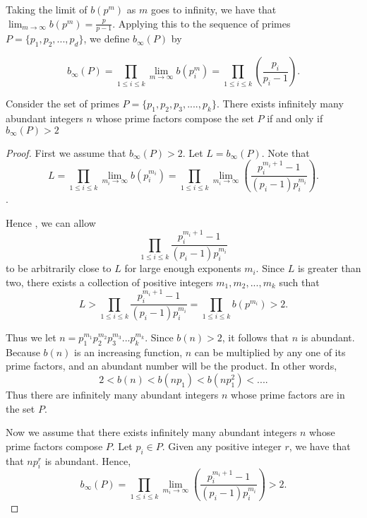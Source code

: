 \documentclass[../paper.tex]{article}
\begin{document}
Taking the limit of $b(p^m)$ as $m$ goes to infinity, we have that
$\lim_{m \rightarrow \infty}b(p^m) = \frac{p}{p-1}$.
Applying this to the sequence of primes $P = \{p_1, p_2, ..., p_d\}$,
we define $b_{\infty}(P)$ by

\begin{equation}\label{b_inf_def}
  b_{\infty}(P) 
  = \prod_{1 \leq i \leq k} \lim_{m \rightarrow \infty}b(p_i^m)
                = \prod_{1 \leq i \leq k}(\frac{p_i}{p_i - 1}) .
\end{equation}

\begin{theorem}\label{b_inf_1}
Consider the set of primes 
%
$P = \{p_{1}, p_{2}, p_{3}, .... , p_{k}\}$.
%
There exists infinitely many abundant integers $n$ whose prime 
factors compose the set $P$  if and only if $b_{\infty}(P) > 2$

\end{theorem}

\begin{proof}

First we assume that $b_{\infty}(P) > 2$. Let $L = b_\infty(P)$. 
Note that
%  
$$L 
%
= \prod_{1 \leq i \leq k} \lim_{m_i \rightarrow \infty}b(p_i^{m_i}) 
%
= \prod_{1 \leq i \leq k} \lim_{m_i \rightarrow \infty} 
%
( \frac{p_i^{m_{i} + 1} -1}{(p_i -1)p_{i}^{m_{i}}}) .$$.

Hence , we can allow
$$\prod_{1 \leq i \leq k} \frac{p_i^{m_{i} + 1} -1}
{(p_i -1)p_{i}^{m_{i}}}$$ 
to be arbitrarily close to $L$ for large 
enough exponents $m_i$. Since $L$ is greater than two, there exists a
collection of positive integers $m_1, m_2, ... , m_k$ such that 
% 
$$L > \prod_{1 \leq i \leq k} \frac{p_i^{m_{i} + 1} -1}
{(p_i -1)p_{i}^{m_{i}}} = \prod_{1 \leq i \leq k} b(p^{m_i}) > 2 .$$
%

Thus we let $n=p_1^{m_1}p_2^{m_2}p_3^{m_3}...p_{k}^{m_k}$. 
Since $b(n) > 2$, it follows that $n$ is abundant. 
Because $b(n)$ is an increasing function, $n$ can be multiplied
by any one of its prime factors, and an abundant number 
will be the product. In other words,
%
$$2 < b(n) < b(np_1) < b(np_1^2) < ... .$$
%
Thus there are infinitely many abundant integers $n$ whose prime
factors are in the set $P$.

Now we assume that there exists infinitely many abundant integers 
$n$ whose prime factors compose $P$. Let $p_i \in P$. Given any
positive integer $r$, we have that that $np_i^r$ is abundant. 
Hence,
%
$$ b_\infty(P) = \prod_{1 \leq i \leq k} \lim_{m_i \rightarrow 
\infty} ( \frac{p_i^{m_{i} + 1} -1}{(p_i -1)p_{i}^{m_{i}}}) > 2 .$$

\end{proof}
\end{document}
